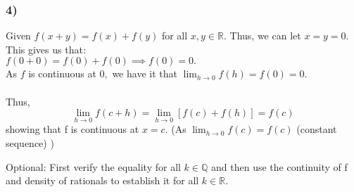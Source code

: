 \documentclass[handout]{beamer}
\begin{document}
\begin{frame}
\frametitle{4)}
Given  $f(x + y) = f(x) + f(y)$ for all $x, y \in \mathbb{R}.$
 Thus, we can let $x = y = 0.$ This gives us that:\\
	$f(0 + 0) = f(0) + f(0) \implies f(0) = 0.$\\
	As $f$ is continuous at $0,$ we have it that $\displaystyle\lim_{h\to 0}f(h) = f(0) = 0.$\\~\\
    Thus,
    \[\lim_{h \rightarrow 0} f(c+h) =  \lim_{h \rightarrow 0}[f(c)+f(h)] = f(c)\]
    showing that f is continuous at $x = c$.
    (As $\displaystyle\lim_{h\to 0}f(c) = f(c)$ (constant sequence) )

    Optional: First verify the equality for all $k \in \mathbb{Q}$ and then use the continuity of f and density of rationals to
    establish it for all $k \in \mathbb{R}$.
\end{frame}
\end{document}
